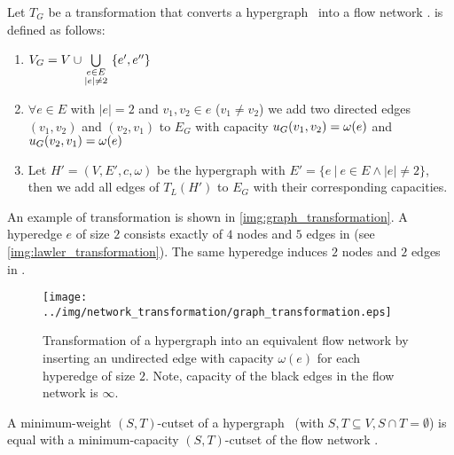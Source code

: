\begin{definition}
Let $T_G$ be a transformation that converts a hypergraph \HypergraphDef~into 
a flow network .  is defined as follows:
\begin{enumerate}
\item $V_G = V \cup \bigcup\limits_{\substack{e \in E \\ |e| \neq 2}}\ \{e', e''\}$
\item $\forall e \in E$ with $|e| = 2$ and $v_1,v_2 \in e$ ($v_1 \neq v_2$) we add 
      two directed edges $(v_1,v_2)$ and $(v_2,v_1)$ to $E_G$ with capacity $u_G(v_1,v_2) = \omega(e)$
      and $u_G(v_2,v_1) = \omega(e)$
\item Let $H' = (V,E',c,\omega)$ be the hypergraph with $E' = \{e\ |\ e \in E \land |e| \neq 2\}$,
      then we add all edges of $T_L(H')$ to $E_G$ with their corresponding capacities.
\end{enumerate} 
\end{definition}

An example of transformation  is shown in \autoref{img:graph_transformation}. A hyperedge
$e$ of size $2$ consists exactly of $4$ nodes and $5$ edges in  (see \autoref{img:lawler_transformation}).
The same hyperedge induces $2$ nodes and $2$ edges in . 
 
\begin{figure}
\centering
\texttt{[image: ../img/network\_transformation/graph\_transformation.eps]}
\caption{Transformation of a hypergraph into an equivalent flow network by inserting 
         an undirected edge with capacity $\omega(e)$ for each hyperedge of size $2$. 
         Note, capacity of the black edges in the flow network is $\infty$.}
\label{img:graph_transformation}
\end{figure}

\begin{theorem}
A minimum-weight $(S,T)$-cutset of a hypergraph \HypergraphDef~(with $S,T \subseteq V,
S \cap T = \emptyset$) is equal with a minimum-capacity $(S,T)$-cutset of the
flow network .
\label{theorem:graph_transformation}
\end{theorem}

